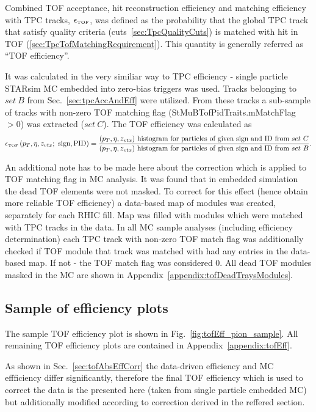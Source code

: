 Combined TOF acceptance, hit reconstruction efficiency and matching efficiency with TPC tracks, $\epsilon_{\textrm{\tiny TOF}}$, was defined as the probability that the global TPC track that satisfy quality criteria (cuts~\ref{sec:TpcQualityCuts}) is matched with hit in TOF (\ref{sec:TpcTofMatchingRequirement}). This quantity is generally referred as ``TOF efficiency''.

It was calculated in the very similiar way to TPC efficiency - single particle STARsim MC embedded into zero-bias triggers was used. Tracks belonging to $set~B$ from Sec.~\ref{sec:tpcAccAndEff} were utilized. From these tracks a sub-sample of tracks with non-zero TOF matching flag (StMuBTofPidTraits.mMatchFlag $>0$) was extracted ($set~C$). The TOF efficiency was calculated as
\begin{equation}\label{eq:tofAccAndEffDefinition}
		\epsilon_{\textrm{\tiny TOF}}\left(p_{T}, \eta, z_{vtx};~\textrm{sign},\textrm{PID}\right) = \frac{(p_{T},\eta, z_{vtx})~\textrm{histogram for particles of given sign and ID from}~set~C}{(p_{T},\eta, z_{vtx})~\textrm{histogram for particles of given sign and ID from}~set~B}.
	\end{equation}

An additional note has to be made here about the correction which is applied to TOF matching flag in MC analysis. It was found that in embedded simulation the dead TOF elements were not masked. To correct for this effect (hence obtain more reliable TOF efficiency) a data-based map of modules was created, separately for each RHIC fill. Map was filled with modules which were matched with TPC tracks in the data. In all MC sample analyses (including efficiency determination) each TPC track with non-zero TOF match flag was additionally checked if TOF module that track was matched with had any entries in the data-based map. If not - the TOF match flag was considered 0. All dead TOF modules masked in the MC are shown in Appendix~\ref{appendix:tofDeadTraysModules}.

\subsection{Sample of  efficiency plots}

The sample TOF efficiency plot is shown in Fig.~\ref{fig:tofEff_pion_sample}. All remaining TOF efficiency plots are contained in Appendix~\ref{appendix:tofEff}.

As shown in Sec.~\ref{sec:tofAbsEffCorr} the data-driven efficiency and MC effficiency differ significantly, therefore the final TOF efficiency which is used to correct the data is the presented here (taken from single particle embedded MC) but additionally modified according to correction derived in the reffered section.

